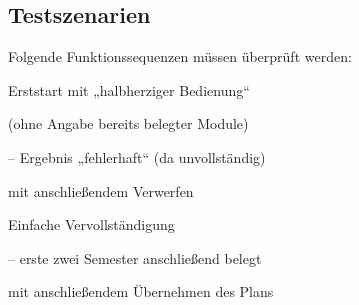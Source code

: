 \newenvironment{tblitemize}{
	\begin{itemize}[nosep,leftmargin=12pt]
}{
	\end{itemize}\hspace{0pt}\vspace{-\baselineskip}
}

\newcommand{\lA}[1]{\label{A#1}A#1}

\newcommand{\refA}[1]{\hyperref[A#1]{/A#1/}}


\subsection{Testszenarien}
Folgende Funktionssequenzen müssen überprüft werden:

\begin{scenario}{Erststart mit „halbherziger Bedienung“}
	\item {} (ohne Angabe bereits belegter Module)
	\item {}
	\item {} – Ergebnis „fehlerhaft“ (da unvollständig)
	\item {} mit anschließendem Verwerfen
	\item {}
	\item {} 
	\item {}
\end{scenario}

\begin{scenario}{Einfache Vervollständigung}
	\item {}
	\item {} – erste zwei Semester anschließend belegt
	\item {}
	\item {} mit anschließendem Übernehmen des Plans
	\item {} 
	\item {}
	\item {}
	\item {}
\end{scenario}

